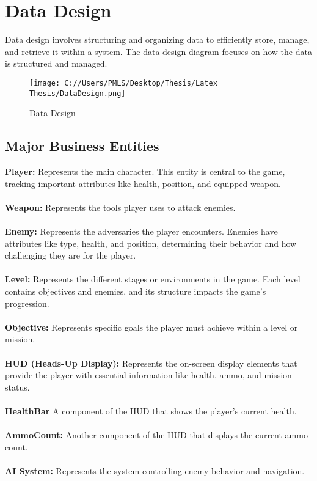 \section{Data Design}
Data design involves structuring and organizing data to efficiently store, manage, and retrieve it within a system.
The data design diagram focuses on how the data is structured and managed.
\\
\begin{figure}[H]
	\centering
    \texttt{[image: C://Users/PMLS/Desktop/Thesis/Latex Thesis/DataDesign.png]}
	\caption{Data Design}
	\label{fig:Data Design Diagram}
\end{figure}

\subsection{Major Business Entities}
\textbf{Player:}
Represents the main character. This entity is central to the game, tracking important attributes like health, position, and equipped weapon.
\\
\\
\textbf{Weapon:}
Represents the tools player uses to attack enemies.
\\
\\
\textbf{Enemy:}
Represents the adversaries the player encounters. Enemies have attributes like type, health, and position, determining their behavior and how challenging they are for the player.
\\
\\
\textbf{Level:}
Represents the different stages or environments in the game. Each level contains objectives and enemies, and its structure impacts the game's progression.
\\
\\
\textbf{Objective:}
Represents specific goals the player must achieve within a level or mission.
\\
\\
\textbf{HUD (Heads-Up Display):}
Represents the on-screen display elements that provide the player with essential information like health, ammo, and mission status.
\\
\\
\textbf{HealthBar}
A component of the HUD that shows the player's current health.
\\
\\
\textbf{AmmoCount:}
Another component of the HUD that displays the current ammo count.
\\
\\
\textbf{AI System:}
Represents the system controlling enemy behavior and navigation.

